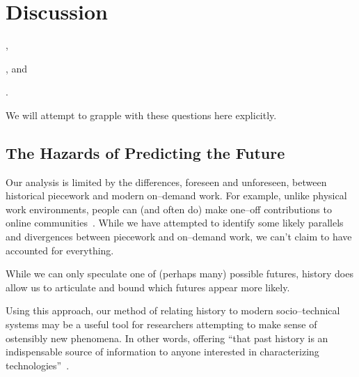 \documentclass[pn4226]{subfiles}
\begin{document}
\section{Discussion}
\begin{inlinelist}
  \item {},
  \item {}, and
  \item {}.
\end{inlinelist}
We will attempt to grapple with these questions here explicitly.


\subsection{The Hazards of Predicting the Future}\label{sec:perilousProblemsPredicting}
Our analysis is limited by the differences, foreseen and unforeseen, between historical piecework and modern on--demand work.
For example, unlike physical work environments, people can (and often do) make one--off contributions to online communities~\cite{mcinnis2016one}.
While we have attempted to identify some likely parallels and divergences between piecework and on--demand work,
we can't claim to have accounted for everything.

While we can only speculate one of (perhaps many) possible futures, history does allow us to articulate and bound which futures appear more likely.

Using this approach,
our method of relating history to modern socio--technical systems may be
a useful tool for researchers attempting
to make sense of ostensibly new phenomena.
In other words, offering ``that past history is an indispensable source of information
to anyone interested in characterizing technologies''~\cite{rosenberg1982inside}.
\end{document}
